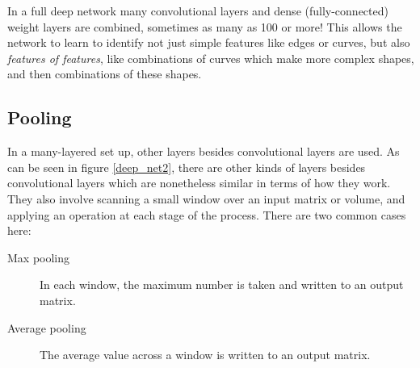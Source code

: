 

In a full deep network many convolutional layers and dense (fully-connected) weight layers are combined, sometimes as many as 100 or more! This allows the network to learn to identify not just simple features like edges or curves, but also \emph{features of features}, like combinations of curves which make more complex shapes, and then combinations of these shapes. 

\subsection{Pooling}


In a many-layered set up, other layers besides convolutional layers are used. As can be seen in figure \ref{deep_net2}, there are other kinds of layers besides convolutional layers which are nonetheless similar in terms of how they work. They also involve scanning a small window over an input matrix or volume, and applying an operation at each stage of the process. There are two common cases here:

\begin{description}
\item[Max pooling] In each window, the maximum number is taken and written to an output matrix.
\item[Average pooling] The average value across a window is written to an output matrix.
\end{description}

